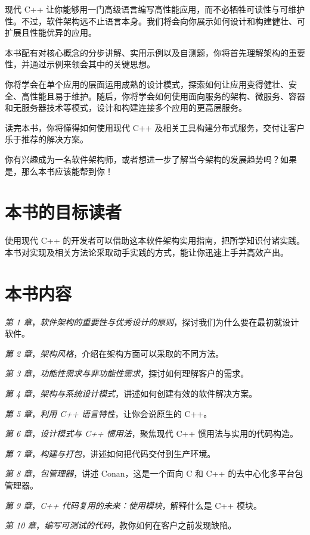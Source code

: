 现代 C++ 让你能够用一门高级语言编写高性能应用，而不必牺牲可读性与可维护性。不过，软件架构远不止语言本身。我们将会向你展示如何设计和构建健壮、可扩展且性能优异的应用。

本书配有对核心概念的分步讲解、实用示例以及自测题，你将首先理解架构的重要性，并通过示例来领会其中的关键思想。

你将学会在单个应用的层面运用成熟的设计模式，探索如何让应用变得健壮、安全、高性能且易于维护。随后，你将学会如何使用面向服务的架构、微服务、容器和无服务器技术等模式，设计和构建连接多个应用的更高层服务。

读完本书，你将懂得如何使用现代 C++ 及相关工具构建分布式服务，交付让客户乐于推荐的解决方案。

你有兴趣成为一名软件架构师，或者想进一步了解当今架构的发展趋势吗？如果是，那么本书应该能帮到你！

\section*{本书的目标读者}

使用现代 C++ 的开发者可以借助这本软件架构实用指南，把所学知识付诸实践。本书对实现及相关方法论采取动手实践的方式，能让你迅速上手并高效产出。

\section*{本书内容}

\emph{第 1 章}，\emph{软件架构的重要性与优秀设计的原则}，探讨我们为什么要在最初就设计软件。

\emph{第 2 章}，\emph{架构风格}，介绍在架构方面可以采取的不同方法。

\emph{第 3 章}，\emph{功能性需求与非功能性需求}，探讨如何理解客户的需求。

\emph{第 4 章}，\emph{架构与系统设计模式}，讲述如何创建有效的软件解决方案。

\emph{第 5 章}，\emph{利用 C++ 语言特性}，让你会说原生的 C++。

\emph{第 6 章}，\emph{设计模式与 C++ 惯用法}，聚焦现代 C++ 惯用法与实用的代码构造。

\emph{第 7 章}，\emph{构建与打包}，讲述如何把代码交付到生产环境。

\emph{第 8 章}，\emph{包管理器}，讲述 Conan，这是一个面向 C 和 C++ 的去中心化多平台包管理器。

\emph{第 9 章}，\emph{C++ 代码复用的未来：使用模块}，解释什么是 C++ 模块。

\emph{第 10 章}，\emph{编写可测试的代码}，教你如何在客户之前发现缺陷。


